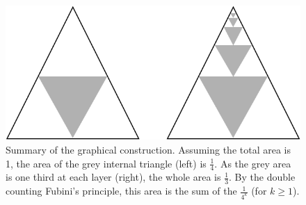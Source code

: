 \begin{itemize}
\begin{figure}
\begin{center}
        \includegraphics[scale=0.3]{FiguresMaths/Sum1over4cascade}
        \caption{Summary of the graphical construction. Assuming the total area is 1, the area of the grey internal triangle (left) is $\frac{1}{4}$.
        As the grey area is one third at each layer (right), the whole area is $\frac{1}{3}$.
        By the double counting Fubini's principle, this area is the sum of the $\frac{1}{4^k}$ (for $k \geq 1$).}
        \label{Fig:Sum1over4cascade}
\end{center}
\end{figure}

\end{itemize}

